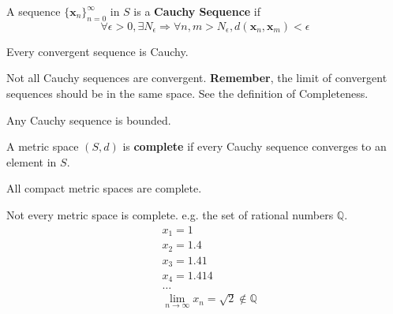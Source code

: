 \begin{definition}
    A sequence $\{\mathbf{x}_n\}_{n=0}^{\infty}$ in $S$ is a \textbf{Cauchy Sequence} if
    \begin{equation*}
        \forall \epsilon > 0, \exists N_{\epsilon} \Rightarrow \forall n,m>N_{\epsilon}, d(\mathbf{x}_n, \mathbf{x}_m) < \epsilon
    \end{equation*}
\end{definition}

\begin{proposition}
    Every convergent sequence is Cauchy.
\end{proposition}

\begin{remark*}
    Not all Cauchy sequences are convergent. \textbf{Remember}, the limit of convergent sequences should be in the same space. See the definition of Completeness.
\end{remark*}

\begin{lemma}
    Any Cauchy sequence is bounded.
\end{lemma}

\begin{definition}[Complete]
    A metric space $(S,d)$ is \textbf{complete} if every Cauchy sequence converges to an element in $S$.
\end{definition}

\begin{proposition}
    All compact metric spaces are complete.
\end{proposition}

\begin{remark*}
    Not every metric space is complete. e.g. the set of rational numbers $\mathbb{Q}$.\begin{align*}
         & x_1 = 1                                              \\
         & x_2 = 1.4                                            \\
         & x_3 = 1.41                                           \\
         & x_4 = 1.414                                          \\
         & \dots                                                \\
         & \lim_{n \to \infty} x_n = \sqrt{2} \notin \mathbb{Q}
    \end{align*}
\end{remark*}

